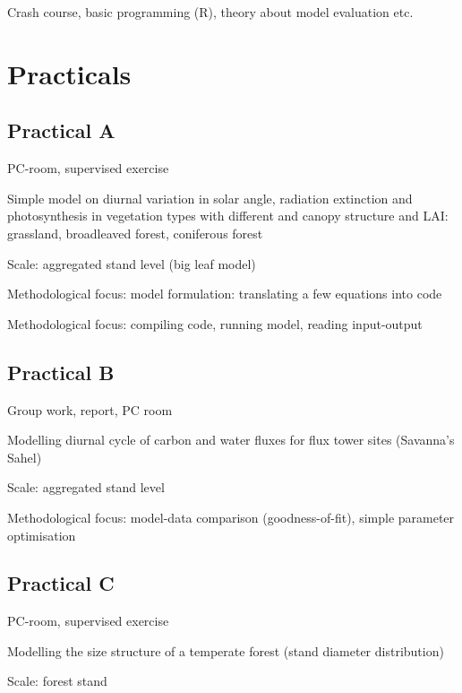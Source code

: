 \documentclass[
  oneside]{book}
\begin{document}
Crash course, basic programming (R), theory about model evaluation etc.

\hypertarget{part-practicals}{%
\part{Practicals}\label{part-practicals}}

\hypertarget{practical-a}{%
\chapter*{Practical A}\label{practical-a}}

PC-room, supervised exercise

Simple model on diurnal variation in solar angle, radiation extinction and photosynthesis in vegetation types with different and canopy structure and LAI: grassland, broadleaved forest, coniferous forest

Scale: aggregated stand level (big leaf model)

Methodological focus: model formulation: translating a few equations into code

Methodological focus: compiling code, running model, reading input-output

\hypertarget{practical-b}{%
\chapter*{Practical B}\label{practical-b}}

Group work, report, PC room

Modelling diurnal cycle of carbon and water fluxes for flux tower sites (Savanna's Sahel)

Scale: aggregated stand level

Methodological focus: model-data comparison (goodness-of-fit), simple parameter optimisation

\hypertarget{practical-c}{%
\chapter*{Practical C}\label{practical-c}}

PC-room, supervised exercise

Modelling the size structure of a temperate forest (stand diameter distribution)

Scale: forest stand
\end{document}

